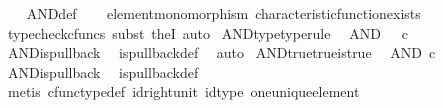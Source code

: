 \begin{isabellebody}
%
\isadelimproof
\ \ %
\endisadelimproof
%
\isatagproof
{}\isamarkupfalse%
\ AND{\isacharunderscore}{\kern0pt}def\isanewline
\ \ \isamarkupfalse%
\ element{\isacharunderscore}{\kern0pt}monomorphism\ characteristic{\isacharunderscore}{\kern0pt}function{\isacharunderscore}{\kern0pt}exists\isanewline
\ \ \isamarkupfalse%
\ {\isacharparenleft}{\kern0pt}typecheck{\isacharunderscore}{\kern0pt}cfuncs{\isacharcomma}{\kern0pt}\ subst\ the{}I{}{\isacharcomma}{\kern0pt}\ auto{\isacharparenright}{\kern0pt}%
\endisatagproof
{\isafoldproof}%
%
\isadelimproof
\isanewline
%
\endisadelimproof
\isanewline
{}\isamarkupfalse%
\ AND{\isacharunderscore}{\kern0pt}type{\isacharbrackleft}{\kern0pt}type{\isacharunderscore}{\kern0pt}rule{\isacharbrackright}{\kern0pt}{\isacharcolon}{\kern0pt}\isanewline
\ \ {\isachardoublequoteopen}AND\ {\isacharcolon}{\kern0pt}\ {\isasymOmega}\ {\isasymtimes}\isactrlsub c\ {\isasymOmega}\ {\isasymrightarrow}\ {\isasymOmega}{\isachardoublequoteclose}\isanewline
%
\isadelimproof
\ \ %
\endisadelimproof
%
\isatagproof
{}\isamarkupfalse%
\ AND{\isacharunderscore}{\kern0pt}is{\isacharunderscore}{\kern0pt}pullback\ \isamarkupfalse%
\ is{\isacharunderscore}{\kern0pt}pullback{\isacharunderscore}{\kern0pt}def\ \isamarkupfalse%
\ auto%
\endisatagproof
{\isafoldproof}%
%
\isadelimproof
\isanewline
%
\endisadelimproof
\isanewline
{}\isamarkupfalse%
\ AND{\isacharunderscore}{\kern0pt}true{\isacharunderscore}{\kern0pt}true{\isacharunderscore}{\kern0pt}is{\isacharunderscore}{\kern0pt}true{\isacharcolon}{\kern0pt}\isanewline
\ \ {\isachardoublequoteopen}AND\ {\isasymcirc}\isactrlsub c\ {\isasymlangle}{\isasymt}{\isacharcomma}{\kern0pt}{\isasymt}{\isasymrangle}\ {\isacharequal}{\kern0pt}\ {\isasymt}{\isachardoublequoteclose}\isanewline
%
\isadelimproof
\ \ %
\endisadelimproof
%
\isatagproof
{}\isamarkupfalse%
\ AND{\isacharunderscore}{\kern0pt}is{\isacharunderscore}{\kern0pt}pullback\ \isamarkupfalse%
\ is{\isacharunderscore}{\kern0pt}pullback{\isacharunderscore}{\kern0pt}def\isanewline
\ \ \isamarkupfalse%
\ {\isacharparenleft}{\kern0pt}metis\ cfunc{\isacharunderscore}{\kern0pt}type{\isacharunderscore}{\kern0pt}def\ id{\isacharunderscore}{\kern0pt}right{\isacharunderscore}{\kern0pt}unit\ id{\isacharunderscore}{\kern0pt}type\ one{\isacharunderscore}{\kern0pt}unique{\isacharunderscore}{\kern0pt}element{\isacharparenright}{\kern0pt}%
\endisatagproof
{\isafoldproof}%

\end{isabellebody}

